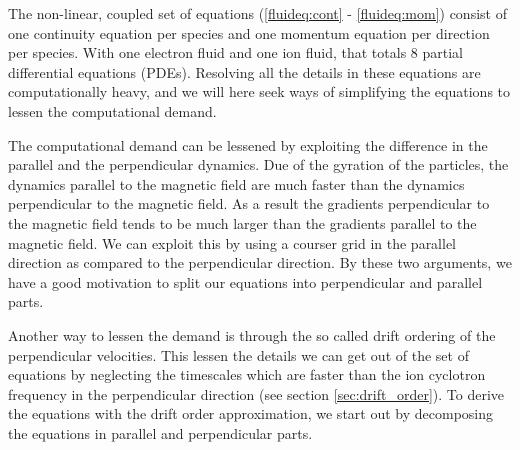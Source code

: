 The non-linear, coupled set of equations (\ref{fluideq:cont} - \ref{fluideq:mom}) consist of one continuity equation per species and one momentum equation per direction per species.
 With one electron fluid and one ion fluid, that totals $8$ partial differential equations (PDEs).
Resolving all the details in these equations are computationally heavy, and we will here seek ways of simplifying the equations to lessen the computational demand.

The computational demand can be lessened by exploiting the difference in the parallel and the perpendicular dynamics.
Due of the gyration of the particles, the dynamics parallel to the magnetic field are much faster than the dynamics perpendicular to the magnetic field.
As a result the gradients perpendicular to the magnetic field tends to be much larger than the gradients parallel to the magnetic field.
We can exploit this by using a courser grid in the parallel direction as compared to the perpendicular direction.
By these two arguments, we have a good motivation to split our equations into perpendicular and parallel parts.

Another way to lessen the demand is through the so called drift ordering of the perpendicular velocities.
 This lessen the details we can get out of the set of equations by neglecting the timescales which are faster than the ion cyclotron frequency in the perpendicular direction (see section \ref{sec:drift_order}).
 To derive the equations with the drift order approximation, we start out by decomposing the equations in parallel and perpendicular parts.

